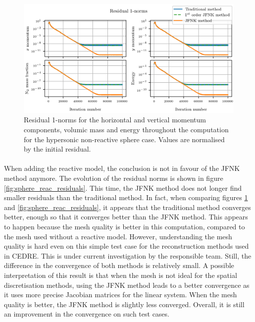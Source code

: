         \begin{figure}
          \centering
          \includegraphics{figures/sphere_residuals.png}
          \caption{Residual 1-norms for the horizontal and vertical momentum components,  volumic mass and energy throughout the computation for the hypersonic non-reactive sphere case.
          Values are normalised by the initial residual.}
          \label{fig:sphere_residuals}
        \end{figure}

        \paragraph{}
        When adding the reactive model, the conclusion is not in favour of the JFNK method anymore.
        The evolution of the residual norms is shown in figure \ref{fig:sphere_reac_residuals}.
        This time, the JFNK method does not longer find smaller residuals than the traditional method.
        In fact, when comparing figures \ref{fig:sphere_residuals} and \ref{fig:sphere_reac_residuals}, it appears that the traditional method converges better, enough so that it converges better than the JFNK method.
        This appears to happen because the mesh quality is better in this computation, compared to the mesh used without a reactive model.
        However, understanding the mesh quality is hard even on this simple test case for the reconstruction methods used in CEDRE.
        This is under current investigation by the responsible team.
        Still, the difference in the convergence of both methods is relatively small.
        A possible interpretation of this result is that when the mesh is not ideal for the spatial discretisation methods, using the JFNK method leads to a better convergence as it uses more precise Jacobian matrices for the linear system.
        When the mesh quality is better, the JFNK method is slightly less converged.
        Overall, it is still an improvement in the convergence on such test cases.

